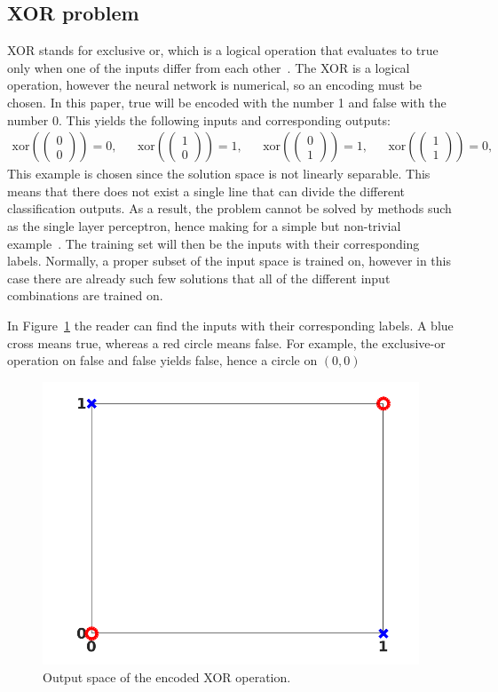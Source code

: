 \subsection{XOR problem}\label{s:xor}
XOR stands for exclusive or, which is a logical operation that evaluates to true only when one of the inputs differ from each other~\cite{Simpson1987}.
The XOR is a logical operation, however the neural network is numerical, so an encoding must be chosen.
In this paper, true will be encoded with the number 1 and false with the number 0.
This yields the following inputs and corresponding outputs:
\begin{align*}
    \text{xor}\left(
    \begin{pmatrix}
            0 \\0
        \end{pmatrix}
    \right)
    =
    0, &  &
    \text{xor}\left(
    \begin{pmatrix}
            1 \\0
        \end{pmatrix}
    \right)
    =
    1, &  &
    \text{xor}\left(
    \begin{pmatrix}
            0 \\1
        \end{pmatrix}
    \right)
    =
    1, &  &
    \text{xor}\left(
    \begin{pmatrix}
            1 \\1
        \end{pmatrix}
    \right)
    =
    0,
\end{align*}
This example is chosen since the solution space is not linearly separable.
This means that there does not exist a single line that can divide the different classification outputs.
As a result, the problem cannot be solved by methods such as the single layer perceptron, hence making for a simple but non-trivial example~\cite{Shiffman2018}. The training set will then be the inputs with their corresponding labels. Normally, a proper subset of the input space is trained on, however in this case there are already such few solutions that all of the different input combinations are trained on.

In Figure~\ref{fig:xor} the reader can find the inputs with their corresponding labels. A blue cross means true, whereas a red circle means false.
For example, the exclusive-or operation on false and false yields false, hence a circle on \((0,0)\)
\begin{figure}[H]
    \centering
    \includegraphics[width = .45\linewidth]{images/nn/xor.png}
    \caption{Output space of the encoded XOR operation.}\label{fig:xor}
\end{figure}
